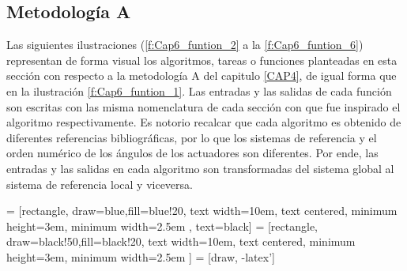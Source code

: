     \subsection{Metodología A}
    
    Las siguientes ilustraciones (\ref{f:Cap6_funtion_2} a la \ref{f:Cap6_funtion_6}) representan de forma visual los algoritmos, tareas o funciones planteadas en esta sección con respecto a la  metodología A del capitulo \ref{CAP4}, de igual forma que en la ilustración \ref{f:Cap6_funtion_1}. Las entradas y las salidas de cada función son escritas con las misma nomenclatura de cada sección con que fue inspirado el algoritmo respectivamente. Es notorio recalcar que cada algoritmo es obtenido de diferentes referencias bibliográficas, por lo que los sistemas de referencia y el orden numérico de los ángulos de los actuadores son diferentes. Por ende, las entradas y las salidas en cada algoritmo son transformadas del sistema global al sistema de referencia local y viceversa.     
    

            \hspace{1cm}


     = [rectangle, draw=blue,fill=blue!20, text width=10em, text centered, minimum height=3em, minimum width=2.5em , text=black]
     = [rectangle, draw=black!50,fill=black!20, text width=10em, text centered, minimum height=3em, minimum width=2.5em ]
     = [draw, -latex']

